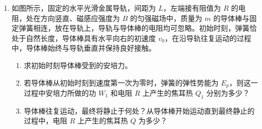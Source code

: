 \documentclass[\gkver]{gaokaozhenti}
\begin{document}
\begin{enumerate}
\begin{enumerate}
	\item
	洛埃镜实验的基本装置如图所示，$S$ 为单色光源，$M$ 为一平面镜。试用平面镜成像作图法在答题卡上画出 $S$ 经平面镜反射后的光与直接发出的光在光屏上相交的区域。

	\item
	设光源 $S$ 到平面镜的垂直距离和到光屏的垂直距离分别为 $a$ 和 $L$，光的波长为 $\lambda$，在光屏上形成干涉条纹。写出相邻两条亮纹（或暗纹）间距离 $\Delta x$ 的表达式。
\end{enumerate}



\item
如图所示，固定的水平光滑金属导轨，间距为 $L$，左端接有阻值为 $R$ 的电阻，处在方向竖直、磁感应强度为 $B$ 的匀强磁场中，质量为 $m$ 的导体棒与固定弹簧相连，放在导轨上，导轨与导体棒的电阻均可忽略。初始时刻，弹簧恰处于自然长度，导体棒具有水平向右的初速度 $v_{0}$，在沿导轨往复运动的过程中，导体棒始终与导轨垂直并保持良好接触。

\begin{enumerate}
	\item
	求初始时刻导体棒受到的安培力。

	\item
	若导体棒从初始时刻到速度第一次为零时，弹簧的弹性势能为 $E_{p}$，则这一过程中安培力所做的功 $W_{1}$ 和电阻 $R$ 上产生的焦耳热 $Q_{1}$ 分别为多少？

	\item
	导体棒往复运动，最终将静止于何处？从导体棒开始运动直到最终静止的过程中，电阻 $R$ 上产生的焦耳热 $Q$ 为多少？
\end{enumerate}


\end{enumerate}
\end{document}
